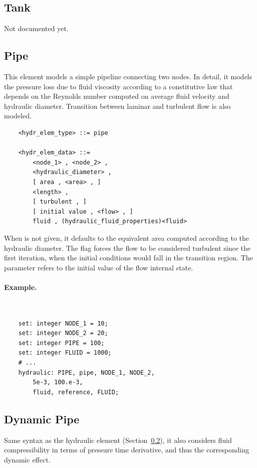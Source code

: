 \subsection{Tank}
\label{sec:EL:HYDR:TANK}
Not documented yet.



\subsection{Pipe}
\label{sec:EL:HYDR:PIPE}
This element models a simple pipeline connecting two  nodes.
In detail, it models the pressure loss due to fluid viscosity
according to a constitutive law that depends on the Reynolds number
computed on average fluid velocity and hydraulic diameter.
Transition between laminar and turbulent flow is also modeled.
\begin{verbatim}
    <hydr_elem_type> ::= pipe

    <hydr_elem_data> ::=
        <node_1> , <node_2> ,
        <hydraulic_diameter> ,
        [ area , <area> , ]
        <length> ,
        [ turbulent , ]
        [ initial value , <flow> , ]
        fluid , (hydraulic_fluid_properties)<fluid>
\end{verbatim}
When  is not given, it defaults to the equivalent area
computed according to the hydraulic diameter.
The flag  forces the flow to be considered turbulent
since the first iteration, when the initial conditions would fall
in the transition region.
The  parameter refers to the initial value
of the flow internal state.

\paragraph{Example.} \
\begin{verbatim}
    set: integer NODE_1 = 10;
    set: integer NODE_2 = 20;
    set: integer PIPE = 100;
    set: integer FLUID = 1000;
    # ...
    hydraulic: PIPE, pipe, NODE_1, NODE_2,
        5e-3, 100.e-3,
        fluid, reference, FLUID;
\end{verbatim}



\subsection{Dynamic Pipe}
\label{sec:EL:HYDR:DYNAMIC_PIPE}
Same syntax as the  hydraulic element
(Section~\ref{sec:EL:HYDR:PIPE}),
it also considers fluid compressibility in terms of pressure time derivative,
and thus the corresponding dynamic effect.




